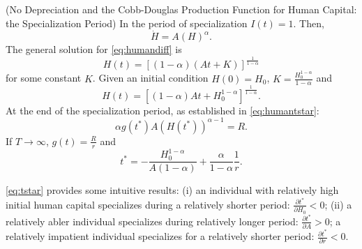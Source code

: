 \begin{example} (No Depreciation and the Cobb-Douglas Production Function for Human Capital: the Specialization Period)
In the period of specialization $I(t) = 1$. Then,
\begin{equation}
\dot{H} = A \left( H \right)^{\alpha} \label{eq:humandiff}.
\end{equation}
The general solution for \eqref{eq:humandiff} is
\begin{equation}
H(t) = \left[ (1 - \alpha)(At + K) \right]^{\frac{1}{1-\alpha}}
\end{equation}
for some constant $K$. Given an initial condition $H(0) = H_{0}$, $K = \frac{H_{0}^{1-\alpha}}{1-\alpha}$ and
\begin{equation}
H(t) = \left[ (1 - \alpha)At + H_{0}^{1-\alpha} \right]^{\frac{1}{1-\alpha}} \label{eq:hbeforetstar}.
\end{equation}
At the end of the specialization period, as established in \eqref{eq:humantstar}:
\begin{equation}
\alpha g(t^*) A \left( H(t^*) \right)^{\alpha - 1} = R.
\end{equation}
If $T \rightarrow \infty$, $g(t) = \frac{R}{r}$ and
\begin{equation}
t^* = - \frac{H_{0}^{1 - \alpha}}{A(1 - \alpha)} + \frac{\alpha}{1 - \alpha}\frac{1}{r}. \label{eq:tstar}
\end{equation}

\indent \eqref{eq:tstar} provides some intuitive results: (i) an individual with relatively high initial human capital specializes during a relatively shorter period: $\frac{\partial t^*}{\partial       H_{0}} < 0$; (ii) a relatively abler individual specializes during relatively longer period: $\frac{\partial t^*}{\partial A} > 0$; a relatively impatient individual specializes for a relatively shorter period: $\frac{\partial t^*}{\partial r} < 0$.
\end{example}

